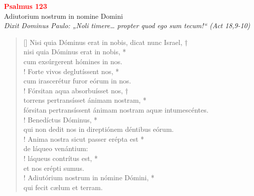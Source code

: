 


\def\greinitialformat#1{%
{\fontsize{39}{39}\selectfont #1}%
}




\vspace{0.3cm}
\begin{center}
 \textcolor{red}{\large \bf Psalmus 123}\\
Adiutorium nostrum in nomine Domini\\
\textit{\small Dixit Dominus Paulo: „Noli timere… propter quod ego sum tecum!“ (Act 18,9-10)}
\end{center}
\begin{verse}[\versewidth]
Nisi quia Dóminus erat in nobis, dicat nunc Israel, †\\
nisi quia Dóminus erat in nobis, *\\
cum exsúrgerent hómines in nos.\\!
\vin Forte vivos deglutíssent nos, *\\
\vin cum irascerétur furor eórum in nos.\\!
Fórsitan aqua absorbuísset nos, †\\
torrens pertransísset ánimam nostram, *\\
fórsitan pertransíssent \verselinebreak ánimam nostram aquæ intumescéntes.\\!
\vin Benedíctus Dóminus, *\\
\vin qui non dedit nos in direptiónem déntibus eórum.\\!
Anima nostra sicut passer erépta est *\\
de láqueo venántium:\\!
\vin láqueus contrítus est, *\\
\vin et nos erépti sumus.\\!
Adiutórium nostrum in nómine Dómini, *\\
qui fecit cælum et terram.\\
\end{verse}
\vspace{1cm}


